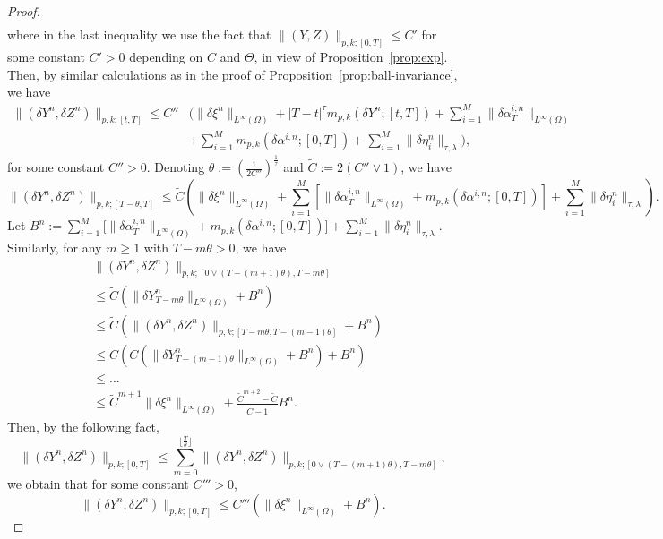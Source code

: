 \documentclass[11pt,reqno]{amsart}
\numberwithin{equation}{section}
\begin{document}
\begin{proof}
\begin{align}
\end{align}
where in the last inequality we use the fact that $\|(Y,Z)\|_{p,k;[0,T]}\le C'$ for some constant $C'>0$ depending on $C$ and $\Theta$, in view of Proposition~\ref{prop:exp}. Then, by similar calculations as in the proof of Proposition~\ref{prop:ball-invariance}, we have
\begin{equation*}
\begin{aligned}
\|(\delta Y^{n},\delta Z^{n})\|_{p,k;[t,T]}\le C'' & \bigg(\|\delta\xi^{n}\|_{L^{\infty}(\Omega)} + |T-t|^{\tau}m_{p,k}(\delta Y^{n};[t,T]) + \sum_{i=1}^{M}\|\delta\alpha^{i,n}_{T}\|_{L^{\infty}(\Omega)}\\
&  + \sum_{i=1}^{M}m_{p,k}(\delta\alpha^{i,n};[0,T]) +  \sum_{i=1}^{M}\|\delta \eta^{n}_{i}\|_{\tau,\lambda}\bigg),
\end{aligned}
\end{equation*}
for some constant $C''>0$.
Denoting $\theta := \left(\frac{1}{2 C''}\right)^{\frac{1}{\tau}}$ and $\tilde C := 2(C''\vee 1)$, we have
\begin{equation*}
\|(\delta Y^{n},\delta Z^{n})\|_{p,k;[T-\theta,T]}  \le \tilde{C} \left(\|\delta\xi^{n}\|_{L^{\infty}(\Omega)} + \sum_{i=1}^{M}\left[\|\delta\alpha^{i,n}_{T}\|_{L^{\infty}(\Omega)} + m_{p,k}(\delta\alpha^{i,n};[0,T])\right] + \sum_{i=1}^{M}\|\delta \eta^{n}_{i}\|_{\tau,\lambda}\right).
\end{equation*}
Let $B^{n} := \sum_{i=1}^{M}\big[\|\delta\alpha^{i,n}_{T}\|_{L^{\infty}(\Omega)} + m_{p,k}(\delta\alpha^{i,n};[0,T])\big] + \sum_{i=1}^{M}\|\delta\eta^{n}_{i}\|_{\tau,\lambda}$. Similarly, for any $m\ge 1$ with $T-m\theta > 0$, we  have 
\begin{equation*}
\begin{aligned}
&\|(\delta Y^{n},\delta Z^{n})\|_{p,k;[0\vee (T-(m+1)\theta), T-m\theta]}\\ 
&\le \tilde{C} \left(\|\delta Y^{n}_{T-m\theta}\|_{L^{\infty}(\Omega)} + B^{n}\right)\\
&\le \tilde{C}\left( \|(\delta Y^{n},\delta Z^{n})\|_{p,k;[T-m\theta, T-(m-1)\theta]} + B^n\right)\\
&\le \tilde{C}\left( \tilde{C} \left(\|\delta Y^{n}_{T-(m-1)\theta}\|_{L^{\infty}(\Omega)} + B^{n}\right) + B^n\right)\\
&\le ...\\
&\le \tilde{C}^{m+1}\|\delta \xi^{n}\|_{L^{\infty}(\Omega)} + \frac{\tilde{C}^{m+2} - \tilde{C}}{\tilde{C} - 1} B^{n}.
\end{aligned}
\end{equation*}
Then, by the following fact,
\[\|(\delta Y^{n},\delta Z^{n})\|_{p,k;[0,T]} \le \sum_{m=0}^{\lfloor\frac{T}{ \theta}\rfloor}\|(\delta Y^{n},\delta Z^{n})\|_{p,k;[0\vee(T-(m+1)\theta), T-m\theta]},\] we obtain that for some constant $C'''>0$,
\[\|(\delta Y^{n},\delta Z^{n})\|_{p,k;[0,T]}\le C'''\left(\|\delta\xi^{n}\|_{L^{\infty}(\Omega)} + B^{n}\right).\]
\end{proof}
\end{document}
